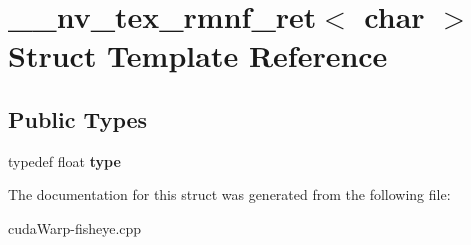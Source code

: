 \hypertarget{struct____nv__tex__rmnf__ret_3_01char_01_4}{}\section{\+\_\+\+\_\+nv\+\_\+tex\+\_\+rmnf\+\_\+ret$<$ char $>$ Struct Template Reference}
\label{struct____nv__tex__rmnf__ret_3_01char_01_4}
\subsection*{Public Types}
\begin{DoxyCompactItemize}
\item 
typedef float {\bfseries type}\hypertarget{struct____nv__tex__rmnf__ret_3_01char_01_4_ae058c3e963343157b3edeefc2e93d6cc}{}\label{struct____nv__tex__rmnf__ret_3_01char_01_4_ae058c3e963343157b3edeefc2e93d6cc}

\end{DoxyCompactItemize}


The documentation for this struct was generated from the following file\+:\begin{DoxyCompactItemize}
\item 
cuda\+Warp-\/fisheye.\+cpp\end{DoxyCompactItemize}
